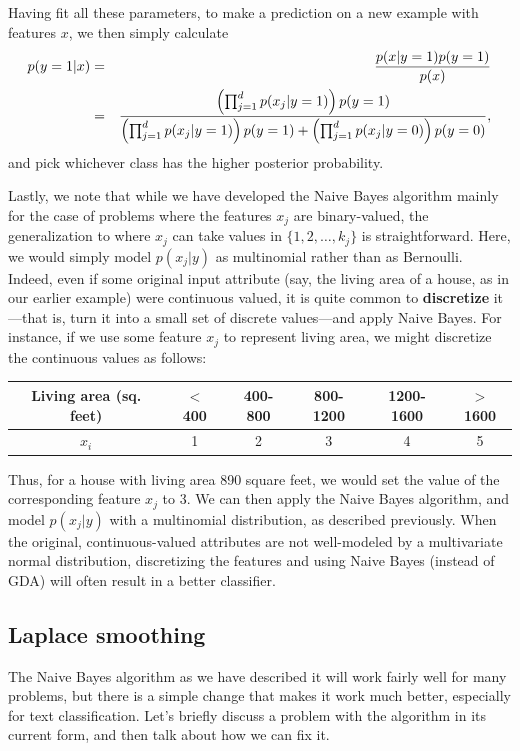 \documentclass{article}
\begin{document}
Having fit all these parameters, to make a prediction on a new example with features $x$,
we then simply calculate
\begin{eqnarray*}
p(y=1|x) &=& \frac{p(x|y=1) p(y=1)}{p(x)} \\
&=& \frac{\left(\prod_{j=1}^{d} p(x_j|y=1)\right) p(y=1)}{\left(\prod_{j=1}^{d} p(x_j|y=1)\right) p(y=1) + \left(\prod_{j=1}^{d} p(x_j|y=0)\right) p(y=0)},
\end{eqnarray*}
and pick whichever class has the higher posterior probability.

Lastly, we note that while we have developed the Naive Bayes algorithm mainly for the
case of problems where the features $x_j$ are binary-valued, the generalization to
where $x_j$ can take values in $\{1, 2, \ldots, k_j\}$
is straightforward.  Here, we would simply model $p(x_j|y)$ as multinomial rather than as Bernoulli.
Indeed,
even if some original input attribute
(say, the living area of a house,
as in our earlier example)
were continuous valued, it is quite common to {\bf discretize} it---that is, turn it into
a small set of discrete values---and apply Naive Bayes.  For instance, if we use some
feature $x_j$ to represent living area, we might discretize the continuous values as follows:

\begin{tabular}{c|c|c|c|c|c}
Living area (sq. feet) & $<$ 400 & 400-800 & 800-1200 & 1200-1600 & $>$1600 \\ \hline
$x_i$ & 1 & 2 & 3 & 4 & 5 \\
\end{tabular}

Thus, for a house with living area 890 square feet, we would set the value of
the corresponding feature $x_j$ to 3.  We can then apply the Naive Bayes algorithm, and model
$p(x_j|y)$ with a multinomial distribution, as described previously.  When the original,
continuous-valued attributes are not well-modeled by a multivariate normal distribution, discretizing the
features and using Naive Bayes (instead of GDA) will often result in a better classifier.

\subsection{Laplace smoothing}

The Naive Bayes algorithm as we have described it will work fairly well for many problems,
but there is a simple change that makes it work much better, especially for text classification.
Let's briefly discuss a problem with the algorithm in its current form, and then talk about
how we can fix it.
\end{document}
